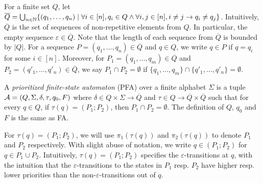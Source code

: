%
For a finite set $Q$, let $\overline{Q} = \bigcup_{n\in \mathbb{N}}\{ (q_1, \ldots, q_n) \mid \forall i \in [n], q_i \in Q \wedge \forall i,j \in[n], i \neq j \rightarrow q_i \neq q_j \}$. Intuitively, $\overline{Q}$ is the set of sequences of non-repetitive elements from $Q$. In particular, the empty sequence $\varepsilon \in \overline{Q}$. Note that the length of each sequence from $\overline{Q}$ is bounded by  $| Q |$. For a sequence $P = (q_1, \ldots, q_n) \in \overline{Q}$ and  $q \in Q$, we write $q \in P$ if  $q = q_i$ for some $i \in [n]$. Moreover, for $P_1 = (q_1, \ldots, q_m) \in \overline{Q}$ and $P_2 = (q'_1, \ldots, q'_n) \in \overline{Q}$, we say $P_1 \cap P_2 = \emptyset$ if $\{q_1, \ldots, q_m\} \cap \{q'_1, \ldots, q'_n\} = \emptyset$.

\begin{definition}\label{def-pfa}
  A \emph{prioritized finite-state automaton} (PFA) over a finite alphabet $\Sigma$ is a tuple $\mathcal{A}=(Q, \Sigma, \delta, \tau, q_0, F)$ where $\delta \in Q
  \times \Sigma \rightarrow \overline{Q}$ and $\tau \in Q \rightarrow \overline{Q} \times \overline{Q}$ such that for every $q \in Q$, if $\tau(q) = (P_1; P_2)$, then $P_1 \cap P_2 = \emptyset$. 
  The definition of $Q$, $q_0$ and $F$ is the same as FA.
\end{definition}
For $\tau(q) = (P_1; P_2)$, we will use $\pi_1(\tau(q))$ and $\pi_2(\tau(q))$ to denote $P_1$ and $P_2$ respectively.  With slight abuse of notation, we write $q\in (P_1; P_2)$ for $q\in P_1\cup P_2$. Intuitively, $\tau(q)=(P_1; P_2)$ specifies the $\varepsilon$-transitions at $q$, with the intuition that the $\varepsilon$-transitions to the states in $P_1$ resp. $P_2$ have higher resp. lower priorities than the non-$\varepsilon$-transitions out of $q$.
  
